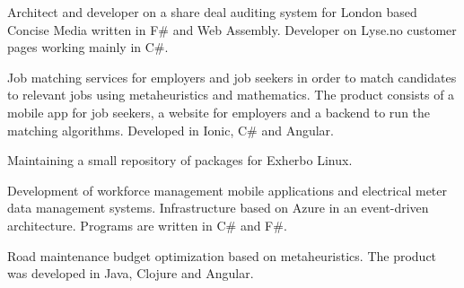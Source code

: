 \documentclass[10pt,a4paper]{altacv}
\begin{document}




\begin{fullwidth}
\makecvheader
\end{fullwidth}




Architect and developer on a share deal auditing system for London based Concise Media written in F\# and Web Assembly.
Developer on Lyse.no customer pages working mainly in C\#.

\divider
    
Job matching services for employers and job seekers in order to match candidates to relevant jobs using metaheuristics and mathematics. The product consists of a mobile app for job seekers, a website for employers and a backend to run the matching algorithms. Developed in Ionic, C\# and Angular.

\divider

Maintaining a small repository of packages for Exherbo Linux.

\divider

Development of workforce management mobile applications and electrical meter data management systems. Infrastructure based on Azure in an event-driven architecture. Programs are written in C\# and F\#.

\divider

Road maintenance budget optimization based on metaheuristics. The product was developed in Java, Clojure and Angular.
\end{document}
